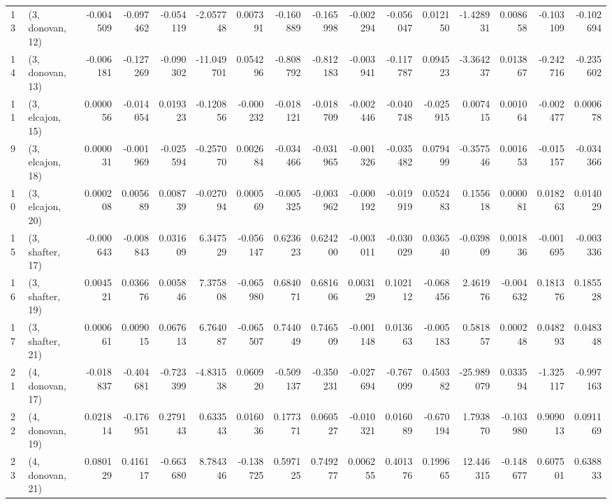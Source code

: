 \begin{tabular}{llrrrrrrrrrrrrrr}
13 &  (3, donovan, 12) &  -0.004509 & -0.097462 & -0.054119 &  -2.057748 &  0.007391 &  -0.160889 & -0.165998 & -0.002294 & -0.056047 &  0.012150 &  -1.428931 &  0.008658 & -0.103109 & -0.102694 \\
14 &  (3, donovan, 13) &  -0.006181 & -0.127269 & -0.090302 & -11.049701 &  0.054296 &  -0.808792 & -0.812183 & -0.003941 & -0.117787 &  0.094523 &  -3.364237 &  0.013867 & -0.242716 & -0.235602 \\
11 &  (3, elcajon, 15) &   0.000056 & -0.014054 &  0.019323 &  -0.120856 & -0.000232 &  -0.018121 & -0.018709 & -0.002446 & -0.040748 & -0.025915 &   0.007415 &  0.001064 & -0.002477 &  0.000678 \\
9  &  (3, elcajon, 18) &   0.000031 & -0.001969 & -0.025594 &  -0.257070 &  0.002684 &  -0.034466 & -0.031965 & -0.001326 & -0.035482 &  0.079499 &  -0.357546 &  0.001653 & -0.015157 & -0.034366 \\
10 &  (3, elcajon, 20) &   0.000208 &  0.005689 &  0.008739 &  -0.027094 &  0.000569 &  -0.005325 & -0.003962 & -0.000192 & -0.019919 &  0.052483 &   0.155618 &  0.000081 &  0.018263 &  0.014029 \\
15 &  (3, shafter, 17) &  -0.000643 & -0.008843 &  0.031609 &   6.347529 & -0.056147 &   0.623623 &  0.624200 & -0.003011 & -0.030029 &  0.036540 &  -0.039809 &  0.001836 & -0.001695 & -0.003336 \\
16 &  (3, shafter, 19) &   0.004521 &  0.036676 &  0.005846 &   7.375808 & -0.065980 &   0.684071 &  0.681606 &  0.003129 &  0.102112 & -0.068456 &   2.461976 & -0.004632 &  0.181376 &  0.185528 \\
17 &  (3, shafter, 21) &   0.000661 &  0.009015 &  0.067613 &   6.764087 & -0.065507 &   0.744049 &  0.746509 & -0.001148 &  0.013663 & -0.005183 &   0.581857 &  0.000248 &  0.048293 &  0.048348 \\
21 &  (4, donovan, 17) &  -0.018837 & -0.404681 & -0.723399 &  -4.831538 &  0.060920 &  -0.509137 & -0.350231 & -0.027694 & -0.767099 &  0.450382 & -25.989079 &  0.033594 & -1.325117 & -0.997163 \\
22 &  (4, donovan, 19) &   0.021814 & -0.176951 &  0.279143 &   0.633543 &  0.016036 &   0.177371 &  0.060527 & -0.010321 &  0.016089 & -0.670194 &   1.793870 & -0.103980 &  0.909013 &  0.091169 \\
23 &  (4, donovan, 21) &   0.080129 &  0.416117 & -0.663680 &   8.784346 & -0.138725 &   0.597125 &  0.749277 &  0.006255 &  0.401376 &  0.199665 &  12.446315 & -0.148677 &  0.607501 &  0.638833 \\

\end{tabular}
